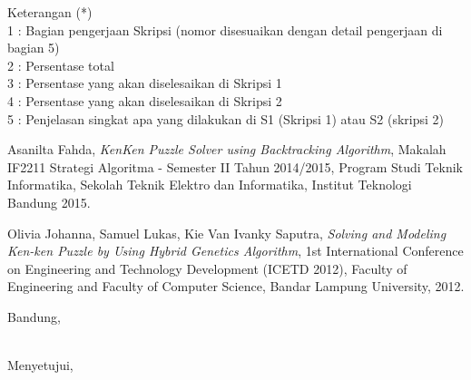 \documentclass[a4paper,twoside]{article}
\begin{document}
Keterangan (*)\\
1 : Bagian pengerjaan Skripsi (nomor disesuaikan dengan detail pengerjaan di bagian 5)\\
2 : Persentase total \\
3 : Persentase yang akan diselesaikan di Skripsi 1 \\
4 : Persentase yang akan diselesaikan di Skripsi 2 \\
5 : Penjelasan singkat apa yang dilakukan di S1 (Skripsi 1) atau S2 (skripsi 2)

\begin{thebibliography}{9}

  Asanilta Fahda,
  \emph{KenKen Puzzle Solver using Backtracking Algorithm},
  Makalah IF2211 Strategi Algoritma - Semester II Tahun 2014/2015,
  Program Studi Teknik Informatika, Sekolah Teknik Elektro dan Informatika, Institut Teknologi Bandung
  2015.
  
  Olivia Johanna, Samuel Lukas, Kie Van Ivanky Saputra,
  \emph{Solving and Modeling Ken-ken Puzzle by Using Hybrid Genetics Algorithm},
  1st International Conference on Engineering and Technology Development (ICETD 2012),
  Faculty of Engineering and Faculty of Computer Science, Bandar Lampung University,
  2012.
  
\end{thebibliography}

\vspace{1cm}
\centering Bandung, \tanggal\\
\vspace{2cm} \nama \\ 
\vspace{1cm}

Menyetujui, \\
\end{document}
